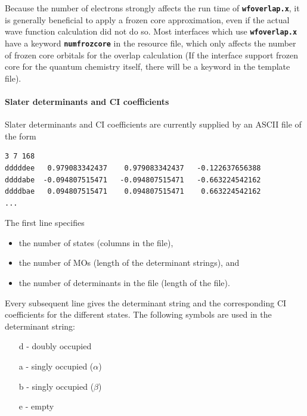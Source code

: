 \documentclass[a4paper,10pt,DIV=15,openany,twoside=false]{scrbook}
\newcommand{\ttt}[1]{\textbf{\texttt{#1}}}
\newenvironment{example}{
  \setlength{\OuterFrameSep}{3pt}
  \vspace{0mm}
  \definecolor{shadecolor}{HTML}{E4F4FF}
  \begin{shaded}
}{
  \end{shaded}
}
\begin{document}
Because the number of electrons strongly affects the run time of \ttt{wfoverlap.x}, it is generally beneficial to apply a frozen core approximation, even if the actual wave function calculation did not do so.
Most interfaces which use \ttt{wfoverlap.x} have a keyword \ttt{numfrozcore} in the resource file, which only affects the number of frozen core orbitals for the overlap calculation (If the interface support frozen core for the quantum chemistry itself, there will be a keyword in the template file).


\paragraph{Slater determinants and CI coefficients}

Slater determinants and CI coefficients are currently supplied by an ASCII file of the form
%
\begin{example}
\begin{verbatim}
3 7 168
dddddee   0.979083342437    0.979083342437   -0.122637656388
ddddabe  -0.094807515471   -0.094807515471   -0.663224542162
ddddbae   0.094807515471    0.094807515471    0.663224542162
...
\end{verbatim}
\end{example}

The first line specifies
%
\begin{itemize}
\item the number of states (columns in the file),
\item the number of MOs (length of the determinant strings), and
\item the number of determinants in the file (length of the file).
\end{itemize}

Every subsequent line gives the determinant string and the corresponding CI coefficients for the different states.
The following symbols are used in the determinant string:

\begin{itemize}
\item[d] - doubly occupied
\item[a] - singly occupied ($\alpha$)
\item[b] - singly occupied ($\beta$)
\item[e] - empty
\end{itemize}
\end{document}
